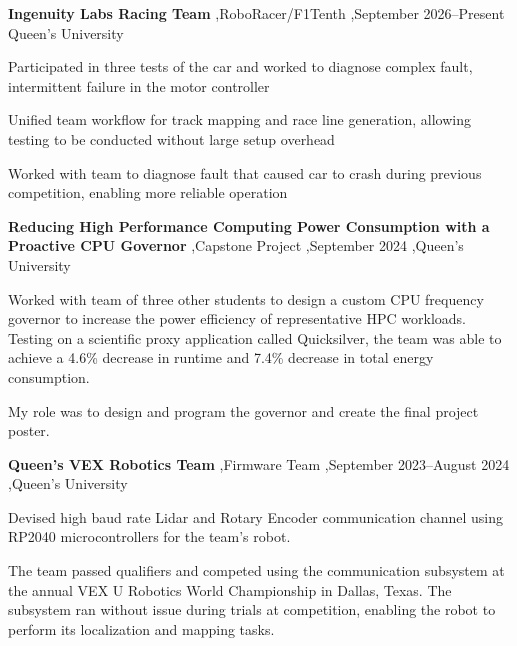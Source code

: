 \documentclass[letterpaper,10pt]{article}
\newenvironment{cvdetails}
  {%
    \begin{list}{\textbullet}{%
      \setlength{\leftmargin}{1.3em}%
      \setlength{\rightmargin}{0pt}%
      \setlength{\labelwidth}{0.6em}%
      \setlength{\labelsep}{0.4em}%
      \setlength{\itemindent}{0pt}%
      \setlength{\listparindent}{0pt}%
      \setlength{\topsep}{3pt}%
      \setlength{\partopsep}{0pt}%
      \setlength{\itemsep}{2pt}%
      \setlength{\parsep}{0pt}%
    }%
  }
  {\end{list}}
\begin{document}
\begin{itemize}

\item
  \textbf{Ingenuity Labs Racing Team} \sep RoboRacer/F1Tenth \sep September 2026--Present\\
  Queen's University

  \begin{cvdetails}
    \item Participated in three tests of the car and worked to diagnose complex fault, intermittent failure in the motor controller
    \item Unified team workflow for track mapping and race line generation, allowing testing to be conducted without large setup overhead
    \item Worked with team to diagnose fault that caused car to crash during previous competition, enabling more reliable operation
  \end{cvdetails}

\item
  \textbf{Reducing High Performance Computing Power Consumption with a Proactive CPU Governor}
  \sep Capstone Project \sep September 2024 \sep Queen's University

  \begin{cvdetails}
    \item Worked with team of three other students to design a custom CPU frequency governor to increase the power efficiency of representative HPC workloads. Testing on a scientific proxy application called Quicksilver, the team was able to achieve a 4.6\% decrease in runtime and 7.4\% decrease in total energy consumption.
    \item My role was to design and program the governor and create the final project poster.
  \end{cvdetails}

\item
  \textbf{Queen's VEX Robotics Team}
  \sep Firmware Team \sep September 2023--August 2024 \sep  Queen's University

  \begin{cvdetails}
    \item Devised high baud rate Lidar and Rotary Encoder communication channel using RP2040
    microcontrollers for the team's robot.
    \item The team passed qualifiers and competed using the communication subsystem at the
    annual VEX U Robotics World Championship in Dallas, Texas. The subsystem ran
    without issue during trials at competition, enabling the robot to perform its localization
    and mapping tasks.
  \end{cvdetails}  


\end{itemize}
\end{document}
